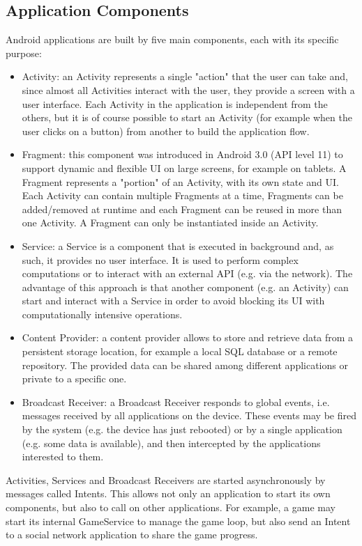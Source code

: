 \documentclass[11pt,a4paper,notitlepage]{article}
\begin{document}
\subsection{Application Components}
Android applications are built by five main components, each with its specific purpose:
\begin{itemize}
	\item Activity: an Activity represents a single "action" that the user can take and, since almost all Activities interact with the user, they provide a screen with a user interface. Each Activity in the application is independent from the others, but it is of course possible to start an Activity (for example when the user clicks on a button) from another to build the application flow.
	\item Fragment: this component was introduced in Android 3.0 (API level 11) to support dynamic and flexible UI on large screens, for example on tablets. A Fragment  represents a "portion" of an Activity, with its own state and UI. Each Activity can contain multiple Fragments at a time, Fragments can be added/removed at runtime and each Fragment can be reused in more than one Activity. A Fragment can only be instantiated inside an Activity.
	\item Service: a Service is a component that is executed in background and, as such, it provides no user interface. It is used to perform complex computations or to interact with an external API (e.g. via the network). The advantage of this approach is that another component (e.g. an Activity) can start and interact with a Service in order to avoid blocking its UI with computationally intensive operations.
	\item Content Provider: a content provider allows to store and retrieve data from a persistent storage location, for example a local SQL database or a remote repository. The provided data can be shared among different applications or private to a specific one.
	\item Broadcast Receiver: a Broadcast Receiver responds to global events, i.e. messages received by all applications on the device. These events may be fired by the system (e.g. the device has just rebooted) or by a single application (e.g. some data is available), and then intercepted by the applications interested to them.
\end{itemize} 
Activities, Services and Broadcast Receivers are started asynchronously by messages called Intents. This allows not only an application to start its own components, but also to call on other applications. For example, a game may start its internal GameService to manage the game loop, but also send an Intent to a social network application to share the game progress.
\end{document}
